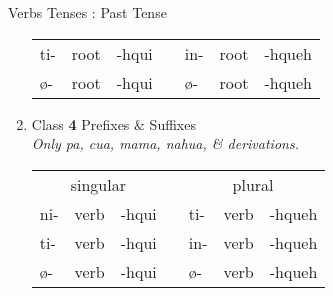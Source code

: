 \documentclass[12pt]{beamer}
\newcommand{\nah}[1]{\textcolor{nahgrn}{#1}}
\newcommand{\trs}[1]{\textcolor{nahblu}{#1}}
\begin{document}
\begin{frame}
\begin{columns}[t]
\begin{column}{.26\linewidth}
\begin{block}{Verbs Tenses : Past Tense}
\begin{enumerate}
\begin{tabular}[t]{lllllll}
    				\nah{ti-}   & root & \trs{-hqui}   & \vline & \nah{in-}   & root & \trs{-hqueh} \\
    				\nah{ø-}    & root & \trs{-hqui}   & \vline & \nah{ø-}    & root & \trs{-hqueh} \\
    			\end{tabular}%
    			\item Class \textbf{4} \nah{Prefixes} \& \trs{Suffixes} \\
    			\textit{Only pa, cua, mama, nahua, \& derivations.}		\\
    			\begin{tabular}[t]{lllllll} 
    				\multicolumn{3}{c}{singular}    & \vline & \multicolumn{3}{c}{plural}        	\\
    				\cline{1-7}
    				\nah{ni-}   & verb & \trs{-hqui}   & \vline & \nah{ti-}   & verb & \trs{-hqueh} \\
    				\nah{ti-}   & verb & \trs{-hqui}   & \vline & \nah{in-}   & verb & \trs{-hqueh} \\
    				\nah{ø-}    & verb & \trs{-hqui}   & \vline & \nah{ø-}    & verb & \trs{-hqueh} \\
    			\end{tabular}
    			
    		\end{enumerate}
    		

\end{block}
\end{column}
\end{columns}
\end{frame}
\end{document}
